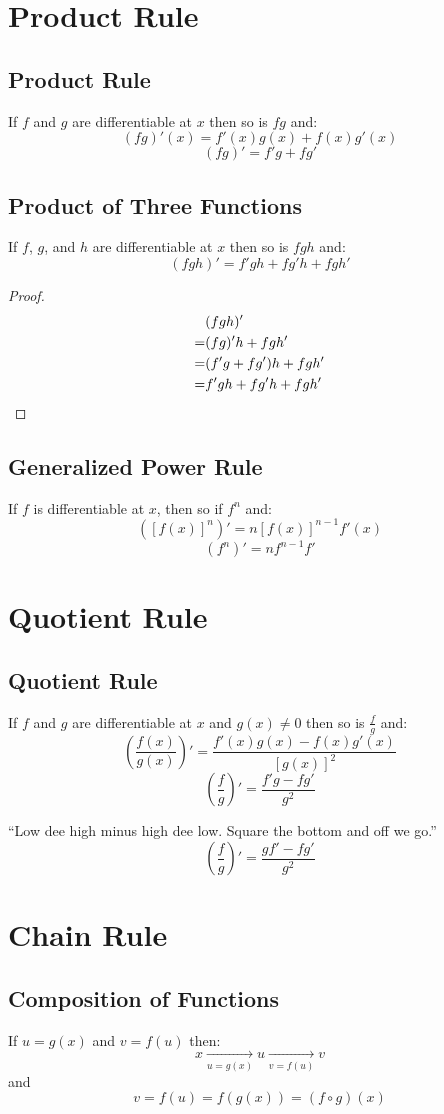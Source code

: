 	\section{Product Rule}
		\subsection{Product Rule}
			If $f$ and $g$ are differentiable at $x$ then so is $fg$ and:
			\[(fg)'(x) = f'(x)g(x) + f(x)g'(x)\]
			\[(fg)' = f'g + fg'\]
		\subsection{Product of Three Functions}
			If $f$, $g$, and $h$ are differentiable at $x$ then so is $fgh$ and:
			\[(fgh)' = f'gh + fg'h + fgh'\]
			\begin{proof}
				\begin{align*}
					 &(fgh)'\\
					=&(fg)'h + fgh'\\
					=&(f'g + fg')h + fgh'\\
					=&f'gh + fg'h + fgh'\qedhere
				\end{align*}
			\end{proof}
		\subsection{Generalized Power Rule}
			If $f$ is differentiable at $x$, then so if $f^n$ and:
			\[([f(x)]^n)' = n[f(x)]^{n-1}f'(x)\]
			\[(f^n)' = nf^{n-1}f'\]
	\section{Quotient Rule}
		\subsection{Quotient Rule}
			If $f$ and $g$ are differentiable at $x$ and $g(x) \neq 0$ then so is $\frac{f}{g}$ and:
			\[\left(\frac{f(x)}{g(x)}\right)' = \frac{f'(x)g(x) - f(x)g'(x)}{[g(x)]^2}\]
			\[\left(\frac{f}{g}\right)' = \frac{f'g - fg'}{g^2}\]

			``Low dee high minus high dee low. Square the bottom and off we go.''
			\[\left(\frac{f}{g}\right)' = \frac{gf' - fg'}{g^2}\]
	\section{Chain Rule}
		\subsection{Composition of Functions}
			If $u=g(x)$ and $v=f(u)$ then:
			\[x \underset{u=g(x)}{\longrightarrow} u \underset{v=f(u)}{\longrightarrow} v\]
			and
			\[v=f(u)=f(g(x))=(f \circ g)(x)\]
